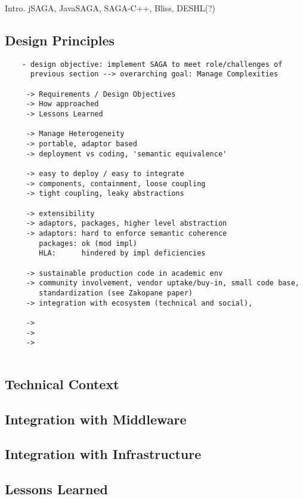 \documentclass[a4paper,10pt]{article}
\begin{document}
 Intro. jSAGA, JavaSAGA, SAGA-C++, Bliss, DESHL(?)

 \subsection{Design Principles}

  \begin{verbatim}
    - design objective: implement SAGA to meet role/challenges of
      previous section --> overarching goal: Manage Complexities
  
     -> Requirements / Design Objectives
     -> How approached
     -> Lessons Learned
  
     -> Manage Heterogeneity
     -> portable, adaptor based
     -> deployment vs coding, 'semantic equivalence'
  
     -> easy to deploy / easy to integrate
     -> components, containment, loose coupling
     -> tight coupling, leaky abstractions
  
     -> extensibility
     -> adaptors, packages, higher level abstraction
     -> adaptors: hard to enforce semantic coherence
        packages: ok (mod impl)
        HLA:      hindered by impl deficiencies
  
     -> sustainable production code in academic env
     -> community involvement, vendor uptake/buy-in, small code base,
        standardization (see Zakopane paper)
     -> integration with ecosystem (technical and social), 
  
     ->
     -> 
     ->
  
  \end{verbatim}

\subsection{Technical Context}

\subsection{Integration with Middleware}

\subsection{Integration with Infrastructure}

\subsection{Lessons Learned}
\end{document}
